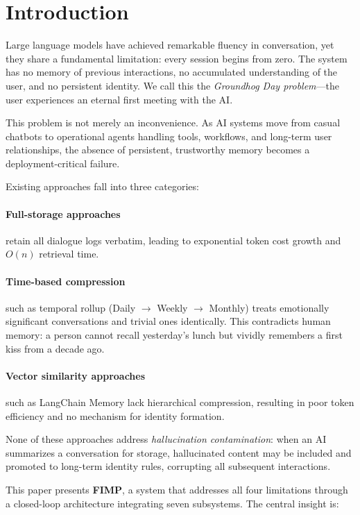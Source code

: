 \documentclass[11pt,a4paper]{article}
\begin{document}
\section{Introduction}

Large language models have achieved remarkable fluency in conversation, yet they share a fundamental limitation: every session begins from zero. The system has no memory of previous interactions, no accumulated understanding of the user, and no persistent identity. We call this the \emph{Groundhog Day problem}---the user experiences an eternal first meeting with the AI.

This problem is not merely an inconvenience. As AI systems move from casual chatbots to operational agents handling tools, workflows, and long-term user relationships, the absence of persistent, trustworthy memory becomes a deployment-critical failure.

Existing approaches fall into three categories:

\paragraph{Full-storage approaches} retain all dialogue logs verbatim, leading to exponential token cost growth and $O(n)$ retrieval time.

\paragraph{Time-based compression} such as temporal rollup (Daily $\to$ Weekly $\to$ Monthly) treats emotionally significant conversations and trivial ones identically. This contradicts human memory: a person cannot recall yesterday's lunch but vividly remembers a first kiss from a decade ago.

\paragraph{Vector similarity approaches} such as LangChain Memory lack hierarchical compression, resulting in poor token efficiency and no mechanism for identity formation.

None of these approaches address \emph{hallucination contamination}: when an AI summarizes a conversation for storage, hallucinated content may be included and promoted to long-term identity rules, corrupting all subsequent interactions.

This paper presents \textbf{FIMP}, a system that addresses all four limitations through a closed-loop architecture integrating seven subsystems. The central insight is:
\end{document}
